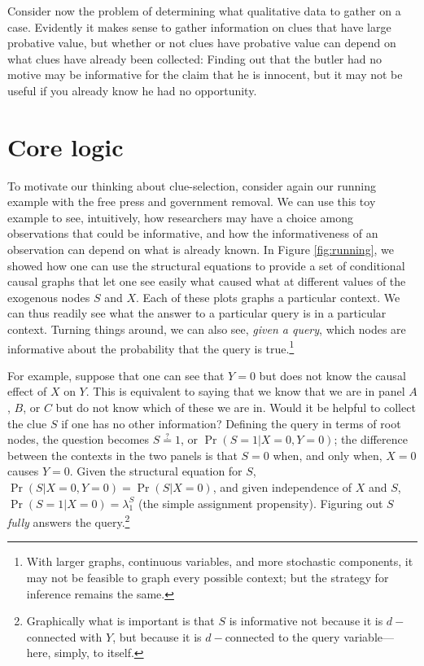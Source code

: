 \documentclass[
  12pt,
]{book}
\begin{document}
Consider now the problem of determining what qualitative data to gather on a case. Evidently it makes sense to gather information on clues that have large probative value, but whether or not clues have probative value can depend on what clues have already been collected: Finding out that the butler had no motive may be informative for the claim that he is innocent, but it may not be useful if you already know he had no opportunity.

\hypertarget{core-logic}{%
\section{Core logic}\label{core-logic}}

To motivate our thinking about clue-selection, consider again our running example with the free press and government removal. We can use this toy example to see, intuitively, how researchers may have a choice among observations that could be informative, and how the informativeness of an observation can depend on what is already known. In Figure \ref{fig:running}, we showed how one can use the structural equations to provide a set of conditional causal graphs that let one see easily what caused what at different values of the exogenous nodes \(S\) and \(X\). Each of these plots graphs a particular context. We can thus readily see what the answer to a particular query is in a particular context. Turning things around, we can also see, \emph{given a query}, which nodes are informative about the probability that the query is true.\footnote{With larger graphs, continuous variables, and more stochastic components, it may not be feasible to graph every possible context; but the strategy for inference remains the same.}

For example, suppose that one can see that \(Y=0\) but does not know the causal effect of \(X\) on \(Y\). This is equivalent to saying that we know that we are in panel \(A\), \(B\), or \(C\) but do not know which of these we are in. Would it be helpful to collect the clue \(S\) if one has no other information? Defining the query in terms of root nodes, the question becomes \(S \stackrel{?}{=} 1\), or \(\Pr(S=1|X=0,Y=0)\); the difference between the contexts in the two panels is that \(S=0\) when, and only when, \(X=0\) causes \(Y=0\). Given the structural equation for \(S\), \(\Pr(S|X=0,Y=0) = \Pr(S|X=0)\), and given independence of \(X\) and \(S\), \(\Pr(S=1|X=0)= \lambda^S_1\) (the simple assignment propensity). Figuring out \(S\) \emph{fully} answers the query.\footnote{Graphically what is important is that \(S\) is informative not because it is \(d-\)connected with \(Y\), but because it is \(d-\)connected to the query variable---here, simply, to itself.}
\end{document}
